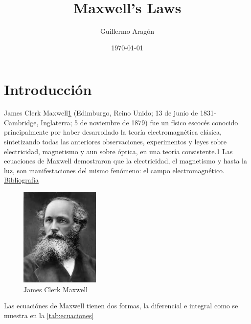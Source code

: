 \documentclass{article}
\author{Guillermo Arag\'on}
\date{\today}
\title{Maxwell's Laws}
\begin{document}
	
	\section{Introducci\'on}
	James Clerk Maxwell\ref{fig:Cara_Maxwell} (Edimburgo, Reino Unido; 13 de junio de 1831-Cambridge, Inglaterra; 5 de noviembre de 1879) fue un físico escocés conocido principalmente por haber desarrollado la teoría electromagnética clásica, sintetizando todas las anteriores observaciones, experimentos y leyes sobre electricidad, magnetismo y aun sobre óptica, en una teoría consistente.1 Las ecuaciones de Maxwell demostraron que la electricidad, el magnetismo y hasta la luz, son manifestaciones del mismo fenómeno: el campo electromagnético. \href{https://es.wikipedia.org/wiki/James_Clerk_Maxwell}{Bibliografía}

	\Blindtext

	\begin{figure}[h!]
		\centering
		\includegraphics[width=0.35\textwidth]{max1}
		\caption{James Clerk Maxwell}
		\label{fig:Cara_Maxwell}
	\end{figure}

	Las ecuaci\'ones de Maxwell tienen dos formas, la diferencial e integral como se muestra en la \ref{tab:ecuaciones}

	


	
\end{document}
